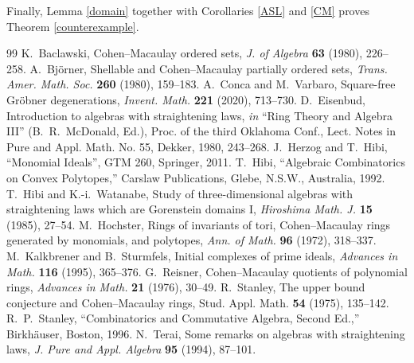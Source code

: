 \documentclass[12pt]{amsart}
\begin{document}
Finally, Lemma \ref{domain} together with Corollaries \ref{ASL} and \ref{CM} proves Theorem \ref{counterexample}.







\begin{thebibliography}{99}
K.~Baclawski, Cohen--Macaulay ordered sets, {\em J. of Algebra} {\bf 63} (1980), 226--258.
A.~Bj\"orner, Shellable and Cohen--Macaulay partially ordered sets, {\em Trans. Amer. Math. Soc.} {\bf 260} (1980), 159--183.
A.~Conca and M.~Varbaro, Square-free Gr\"obner degenerations, {\em Invent. Math.} {\bf 221} (2020), 713--730.
D.~Eisenbud, Introduction to algebras with straightening laws, {\em in} ``Ring Theory and Algebra III'' (B.~R.~McDonald, Ed.), Proc. of the third Oklahoma Conf., Lect. Notes in Pure and Appl. Math. No. 55, Dekker, 1980, 243--268.
J.~Herzog and T.~Hibi, ``Monomial Ideals'', GTM 260, Springer, 2011. 
T.~Hibi, ``Algebraic Combinatorics on Convex Polytopes,'' Carslaw Publications, Glebe, N.S.W., Australia, 1992.
T.~Hibi and K.-i.~Watanabe, Study of three-dimensional algebras with straightening laws which are Gorenstein domains I, {\em Hiroshima Math. J.} {\bf 15} (1985), 27--54. 
M.~Hochster, Rings of invariants of tori, Cohen--Macaulay rings generated by monomials, and polytopes, {\em Ann. of Math.} {\bf 96} (1972), 318--337.
M.~Kalkbrener and B.~Sturmfels, Initial complexes of prime ideals, {\em Advances in Math.} {\bf 116} (1995), 365--376.
G.~Reisner, Cohen--Macaulay quotients of polynomial rings, {\em Advances in Math.} {\bf 21} (1976), 30--49.
R.~Stanley, The upper bound conjecture and Cohen--Macaulay rings, {Stud. Appl. Math.} {\bf 54} (1975), 135--142.
R.~P.~Stanley, ``Combinatorics and Commutative Algebra, Second Ed.,'' Birkh\"auser, Boston, 1996.
N.~Terai, Some remarks on algebras with straightening laws, {\em J. Pure and Appl. Algebra} {\bf 95} (1994), 87--101.
\end{thebibliography}
\end{document}
